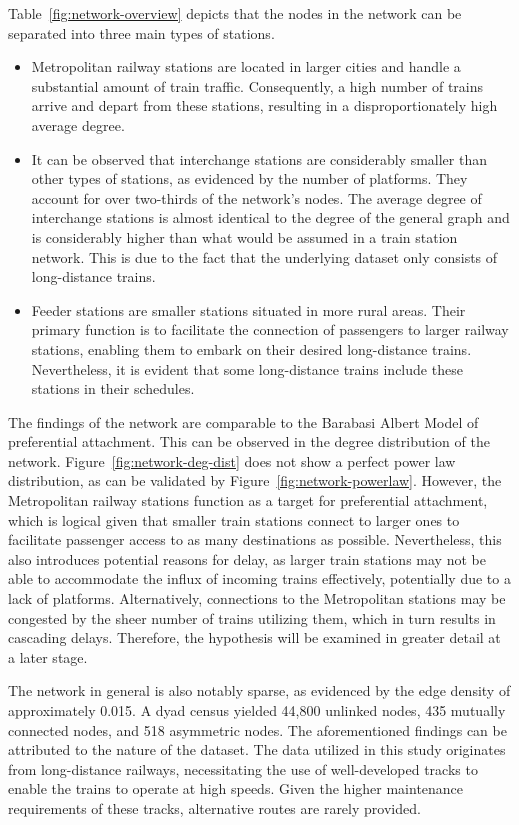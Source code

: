 \documentclass[12pt,a4paper]{article}
\newcounter{para}
\begin{document}
Table~\ref{fig:network-overview} depicts that the nodes in the network can be separated into three main types of stations.

\begin{itemize}
  \item Metropolitan railway stations are located in larger cities and handle a substantial amount of train traffic. 
  Consequently, a high number of trains arrive and depart from these stations, resulting in a disproportionately high average degree.
  \item It can be observed that interchange stations are considerably smaller than other types of stations, as evidenced by the number of platforms. They account for over two-thirds of the network's nodes. The average degree of interchange stations is almost identical to the degree of the general graph and is considerably higher than what would be assumed in a train station network. This is due to the fact that the underlying dataset only consists of long-distance trains.
  \item Feeder stations are smaller stations situated in more rural areas. Their primary function is to facilitate the connection of passengers to larger railway stations, enabling them to embark on their desired long-distance trains. Nevertheless, it is evident that some long-distance trains include these stations in their schedules.
\end{itemize}

The findings of the network are comparable to the Barabasi Albert Model of preferential attachment. This can be observed in the degree distribution of the network. 
Figure~\ref{fig:network-deg-dist} does not show a perfect power law distribution, as can be validated by Figure~\ref{fig:network-powerlaw}. 
However, the Metropolitan railway stations function as a target for preferential attachment, which is logical given that smaller train stations connect to larger ones to facilitate passenger access to as many destinations as possible. 
Nevertheless, this also introduces potential reasons for delay, as larger train stations may not be able to accommodate the influx of incoming trains effectively, potentially due to a lack of platforms. Alternatively, connections to the Metropolitan stations may be congested by the sheer number of trains utilizing them, which in turn results in cascading delays. 
Therefore, the hypothesis will be examined in greater detail at a later stage. 

The network in general is also notably sparse, as evidenced by the edge density of approximately 0.015. 
A dyad census yielded 44,800 unlinked nodes, 435 mutually connected nodes, and 518 asymmetric nodes. 
The aforementioned findings can be attributed to the nature of the dataset. The data utilized in this study originates from long-distance railways, necessitating the use of well-developed tracks to enable the trains to operate at high speeds. Given the higher maintenance requirements of these tracks, alternative routes are rarely provided.
\end{document}
